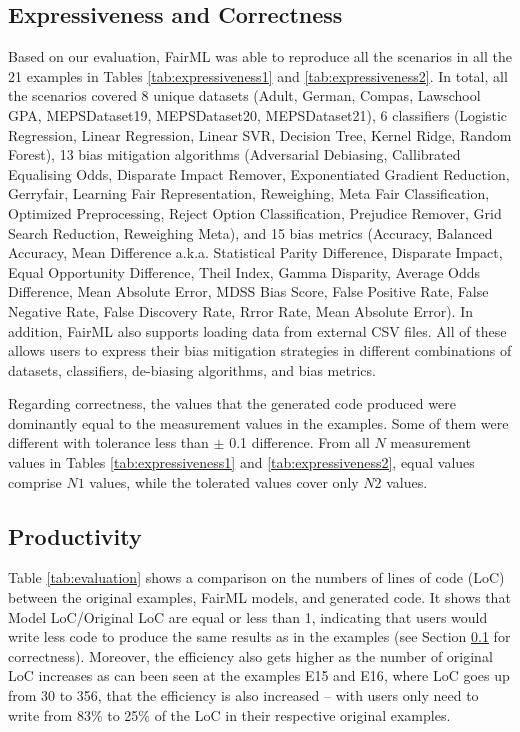 \documentclass[sigconf,review]{acmart}
\begin{document}
\subsection{Expressiveness and Correctness}
\label{sec:expressiveness_and_correctness}
Based on our evaluation, FairML was able to reproduce all the scenarios in all the 21 examples in Tables \ref{tab:expressiveness1} and \ref{tab:expressiveness2}. In total, all the scenarios covered 8 unique datasets (Adult, German, Compas, Lawschool GPA, MEPSDataset19, MEPSDataset20, MEPSDataset21), 6 classifiers (Logistic Regression, Linear Regression, Linear SVR, Decision Tree, Kernel Ridge, Random Forest), 13 bias mitigation algorithms (Adversarial Debiasing, Callibrated Equalising Odds, Disparate Impact Remover, Exponentiated Gradient Reduction, Gerryfair, Learning Fair Representation, Reweighing, Meta Fair Classification, Optimized Preprocessing, Reject Option Classification, Prejudice Remover, Grid Search Reduction, Reweighing Meta), and 15 bias metrics (Accuracy, Balanced Accuracy, Mean Difference a.k.a. Statistical Parity Difference, Disparate Impact, Equal Opportunity Difference, Theil Index, Gamma Disparity, Average Odds Difference, Mean Absolute Error, MDSS Bias Score, False Positive Rate, False Negative Rate, False Discovery Rate, Rrror Rate, Mean Absolute Error). In addition, FairML also supports loading data from external CSV files. All of these allows users to express their bias mitigation strategies in different combinations of datasets, classifiers, de-biasing algorithms, and bias metrics.

Regarding correctness, the values that the generated code produced were dominantly equal to the measurement values in the examples. Some of them were different with tolerance less than $\pm$ 0.1 difference. From all $N$ measurement values in Tables \ref{tab:expressiveness1} and \ref{tab:expressiveness2}, equal values comprise $N1$ values, while the tolerated values cover only $N2$ values.  


\subsection{Productivity}
\label{sec:productivity}

Table \ref{tab:evaluation} shows a comparison on the numbers of lines of code (LoC) between the original examples, FairML models, and generated code. It shows that \textsf{Model LoC}/\textsf{Original LoC} are equal or less than 1, indicating that users would write less code to produce the same results as in the examples (see Section \ref{sec:expressiveness_and_correctness} for correctness). Moreover, the efficiency also gets higher as the number of original LoC increases as can been seen at the examples \textsf{E15} and \textsf{E16}, where LoC goes up from 30 to 356, that the efficiency is also increased -- with users only need to write from 83\% to 25\% of the LoC in their respective original examples.
\end{document}

